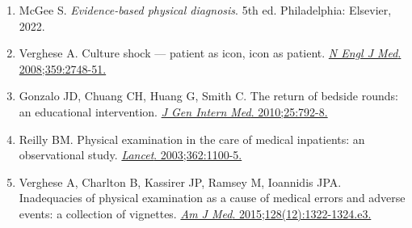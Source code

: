 \documentclass[11pt,a4paper]{article}
\begin{document}
\begin{enumerate}[leftmargin=*]


\item McGee S. \textit{Evidence-based physical diagnosis}. 5th ed. Philadelphia: Elsevier, 2022.

\item Verghese A. Culture shock — patient as icon, icon as patient. \href{https://doi.org/10.1056/NEJMp0807461}{\textit{N Engl J Med}. 2008;359:2748-51.}


\item Gonzalo JD, Chuang CH, Huang G, Smith C. The return of bedside rounds: an educational intervention. \href{https://doi.org/10.1007/s11606-010-1344-7}{\textit{J Gen Intern Med}. 2010;25:792-8.}


\item Reilly BM. Physical examination in the care of medical inpatients: an observational study. \href{https://doi.org/10.1016/S0140-6736(03)14464-9}{\textit{Lancet}. 2003;362:1100-5.}

\item Verghese A, Charlton B, Kassirer JP, Ramsey M, Ioannidis JPA. Inadequacies of physical examination as a cause of medical errors and adverse events: a collection of vignettes. \href{https://doi.org/10.1016/j.amjmed.2015.06.004}{\textit{Am J Med}. 2015;128(12):1322-1324.e3.}



\end{enumerate}
\end{document}
